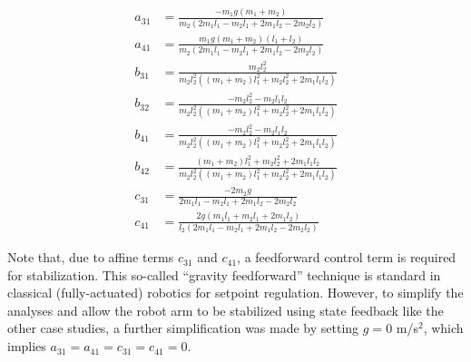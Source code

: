 \begin{subequations}
\begin{align}
	a_{31} &= \frac{-m_{1}g(m_{1} + m_{2})}{m_{2}(2m_{1}l_{1} -m_{2}l_{1}
		+ 2m_{1}l_{2} - 2m_{2}l_{2})}\\
	a_{41} &= \frac{m_{1}g(m_{1} + m_{2})(l_{1} + l_{2})}{m_{2}(2m_{1}l_{1}
		- m_{2}l_{1} + 2m_{1}l_{2} - 2m_{2}l_{2})}\\
	b_{31} &= \frac{m_{2}l_{2}^{2}}{m_{2}l_{2}^{2}((m_{1} + m_{2})l_{1}^{2}
		+ m_{2}l_{2}^{2} + 2m_{1}l_{1}l_{2})}\\
	b_{32} &= \frac{-m_{2}l_{2}^{2} - m_{2}l_{1}l_{2}}{m_{2}l_{2}^{2}((m_{1}
		+ m_{2})l_{1}^{2} + m_{2}l_{2}^{2} + 2m_{1}l_{1}l_{2})}\\
	b_{41} &=\frac{-m_{2}l_{2}^{2} - m_{2}l_{1}l_{2}}{m_{2}l_{2}^{2}((m_{1}
		+ m_{2})l_{1}^{2} + m_{2}l_{2}^{2} + 2m_{1}l_{1}l_{2})}\\
	b_{42} &= \frac{(m_{1} + m_{2})l_{1}^{2} + m_{2}l_{2}^{2}
		+ 2m_{1}l_{1}l_{2}}{m_{2}l_{2}^{2}((m_{1} + m_{2})l_{1}^{2}
		+ m_{2}l_{2}^{2} + 2m_{1}l_{1}l_{2})}\\
	c_{31} &= \frac{-2m_{2}g}{2m_{1}l_{1} -m_{2}l_{1} + 2m_{1}l_{2} - 2m_{2}l_{2}}\\
	c_{41} &= \frac{2g(m_{1}l_{1} + m_{2}l_{1} + 2m_{1}l_{2})}{l_{2}(2m_{1}l_{1} -m_{2}l_{1} + 2m_{1}l_{2} - 2m_{2}l_{2})}
\end{align}
\end{subequations}

Note that, due to affine terms $c_{31}$ and $c_{41}$, a feedforward control term is required for stabilization.  This so-called ``gravity feedforward'' technique is standard in classical (fully-actuated) robotics for setpoint regulation.  However, to simplify the analyses and allow the robot arm to be stabilized using state feedback like the other case studies, a further simplification was made by setting $g = 0$ m/s$^{2}$, which implies $a_{31} = a_{41} = c_{31} = c_{41} = 0$.

